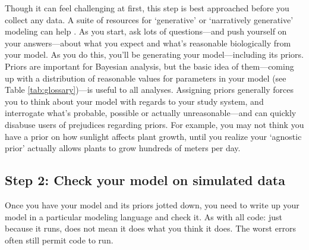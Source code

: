 \documentclass[11pt]{article}
\begin{document}
Though it can feel challenging at first, this step is best approached before you collect any data. A suite of resources for `generative' or `narratively generative' modeling can help \citep{statrethink,betangen}. %
As you start, ask lots of questions---and push yourself on your answers---about what you expect and what's reasonable biologically from your model. %
As you do this, you'll be generating your model---including its priors. Priors are important for Bayesian analysis, but the basic idea of them---coming up with a distribution of reasonable values for parameters in your model (see Table \ref{tab:glossary})---is useful to all analyses. Assigning priors generally forces you to think about your model with regards to your study system, and interrogate what's probable, possible or actually unreasonable---and can quickly disabuse users of prejudices regarding priors. For example, you may not think you have a prior on how sunlight affects plant growth, until you realize your `agnostic prior' actually allows plants to grow hundreds of meters per day. %

\subsection*{Step 2: Check your model on simulated data} 

Once you have your model and its priors jotted down, you need to write up your model in a particular modeling language and check it. As with all code: just because it runs, does not mean it does what you think it does. The worst errors often still permit code to run. %
\end{document}
